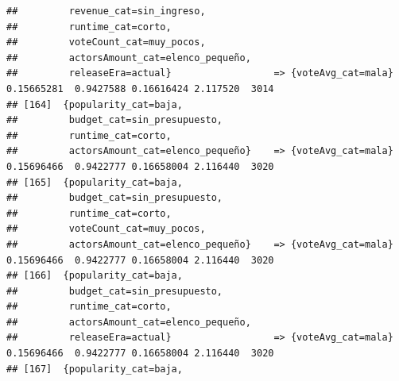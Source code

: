 \documentclass[
]{article}
\begin{document}
\begin{verbatim}
##         revenue_cat=sin_ingreso,                                                                                                
##         runtime_cat=corto,                                                                                                      
##         voteCount_cat=muy_pocos,                                                                                                
##         actorsAmount_cat=elenco_pequeño,                                                                                        
##         releaseEra=actual}                  => {voteAvg_cat=mala}                0.15665281  0.9427588 0.16616424 2.117520  3014
## [164]  {popularity_cat=baja,                                                                                                    
##         budget_cat=sin_presupuesto,                                                                                             
##         runtime_cat=corto,                                                                                                      
##         actorsAmount_cat=elenco_pequeño}    => {voteAvg_cat=mala}                0.15696466  0.9422777 0.16658004 2.116440  3020
## [165]  {popularity_cat=baja,                                                                                                    
##         budget_cat=sin_presupuesto,                                                                                             
##         runtime_cat=corto,                                                                                                      
##         voteCount_cat=muy_pocos,                                                                                                
##         actorsAmount_cat=elenco_pequeño}    => {voteAvg_cat=mala}                0.15696466  0.9422777 0.16658004 2.116440  3020
## [166]  {popularity_cat=baja,                                                                                                    
##         budget_cat=sin_presupuesto,                                                                                             
##         runtime_cat=corto,                                                                                                      
##         actorsAmount_cat=elenco_pequeño,                                                                                        
##         releaseEra=actual}                  => {voteAvg_cat=mala}                0.15696466  0.9422777 0.16658004 2.116440  3020
## [167]  {popularity_cat=baja,                                                                                                    

\end{verbatim}
\end{document}
